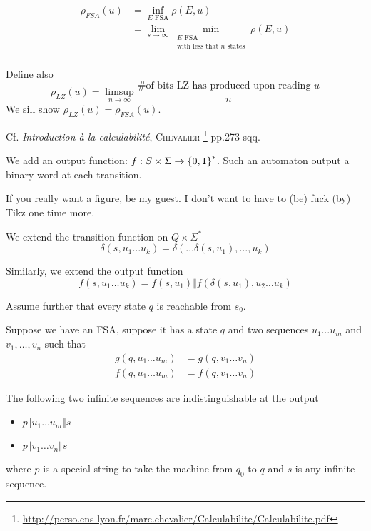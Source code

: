 \[
    \begin{aligned}
        \rho_{FSA}(u) &= \inf\limits_{E\text{ FSA}} \rho(E,u)\\
        &= \lim\limits_{s \to \infty}\min\limits_{\substack{E\text{ FSA}\\\text{with less that }n \text{ states}}} \rho(E,u)\\
    \end{aligned}
\]

Define also
\[
        \rho_{LZ}(u) = \limsup\limits_{n\to\infty} \frac{\text{\# of bits LZ has produced upon reading }u}{n}
\]
We sill show $\rho_{LZ}(u) = \rho_{FSA}(u)$.

\begin{definition}
    Cf. \textit{Introduction à la calculabilité}, \textsc{Chevalier} \footnote{\url{http://perso.ens-lyon.fr/marc.chevalier/Calculabilite/Calculabilite.pdf}} pp.273 sqq.
\end{definition}

We add an output function: $f:S\times \Sigma \to \left\{ 0,1 \right\}^*$. Such an automaton output a binary word at each transition.

If you really want a figure, be my guest. I don't want to have to (be) fuck (by) Tikz one time more.

\begin{notation}
    We extend the transition function on $Q \times \Sigma^*$
    \[
        \delta(s, u_1\ldots u_k) = \delta(\ldots\delta(s, u_1),\ldots,u_k)
    \]
    
    Similarly, we extend the output function
    \[
        f(s,u_1\ldots u_k) = f(s,u_1) \Vert f(\delta(s, u_1), u_2\ldots u_k)    
    \]
\end{notation}

Assume further that every state $q$ is reachable from $s_0$.

Suppose we have an FSA, suppose it has a state $q$ and two sequences $u_1\ldots u_m$ and $v_1,\ldots,v_n$ such that
\[
    \begin{aligned}
        g(q, u_1\ldots u_m) &= g(q, v_1\ldots v_n)\\
        f(q, u_1\ldots u_m) &= f(q, v_1\ldots v_n)
    \end{aligned}
\]

\begin{theorem}
    The following two infinite sequences are indistinguishable at the output
    \begin{itemize}
        \item $p \Vert u_1 \ldots u_m \Vert s$
        \item $p \Vert v_1 \ldots v_n \Vert s$
    \end{itemize}
    where $p$ is a special string to take the machine from $q_0$ to $q$ and $s$ is any infinite sequence.
\end{theorem}

